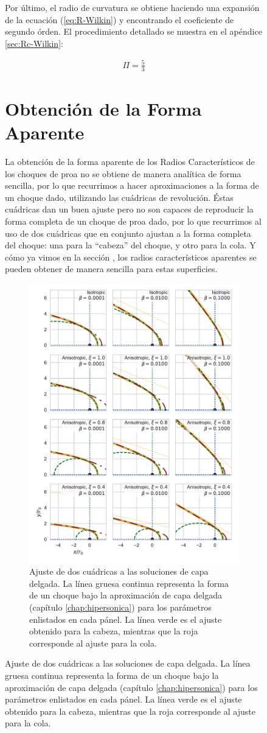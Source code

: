\begin{figure}
Por último, el radio de curvatura se obtiene haciendo una expansión de la ecuación (\ref{eq:R-Wilkin}) y encontrando el coeficiente de segundo órden. El procedimiento detallado se muestra en el apéndice \ref{sec:Rc-Wilkin}:

\begin{align}
\Pi = \frac{5}{3} \label{eq:Rc-Wilkin}
\end{align}

\section{Obtención de la Forma Aparente}
La obtención de la forma aparente de los Radios Característicos de los choques de proa no se obtiene de manera analítica de forma sencilla, por lo que recurrimos a hacer aproximaciones a la forma de un choque dado, utilizando las cuádricas de revolución. Éstas cuádricas dan un buen ajuste pero no son capaces de reproducir la forma completa de un choque de proa dado, por lo que recurrimos al uso de dos cuádricas que en conjunto ajustan a la forma completa del choque: una para la ``cabeza'' del choque, y otro para la cola. Y cómo ya vimos en la sección , los radios característicos aparentes se pueden obtener de manera sencilla para estas superficies.

\begin{figure}
  \includegraphics[width = 0.8\linewidth]{./Figures/conic-head-tail-analytic}
  \caption{Ajuste de dos cuádricas a las soluciones de capa delgada. La línea gruesa continua representa la forma de un choque bajo la aproximación de capa delgada (capítulo \ref{chap:hipersonica}) para los parámetros enlistados en cada pánel. La línea verde es el ajuste obtenido para la cabeza, mientras que la roja corresponde al ajuste para la cola.}
  \label{fig:conic-head-tail-fit}
\end{figure}


\end{figure}
